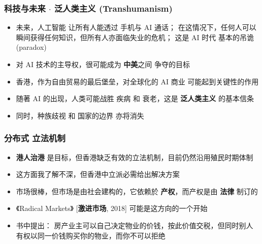 \documentclass[10pt]{beamer}
\newcommand{\emp}[1]{{\color{blue}\textbf{#1}}}
\newif\ifframeinlbf
\begin{document}
\frameinlbftrue
\begin{frame}
\frametitle{科技与未来 $\cdot$ 泛人类主义 (Transhumanism)}
\begin{itemize}
	\item 未来，人工智能 让所有人能透过 手机与 AI 通话； 在这情况下，任何人可以瞬间获得任何知识，但所有人亦面临失业的危机； 这是 AI 时代 基本的吊诡 (paradox)
	
	\item 对 AI 技术的主导权，很可能成为 \textbf{中美}之间 争夺的目标
	
	\item 香港，作为自由贸易的最后堡垒，对全球化的 AI 商业 可能起到关键性的作用
	
	\item 随著 AI 的出现，人类可能战胜 疾病 和 衰老，这是 \emp{泛人类主义} 的基本信条
	
	\item 同时，种族歧视 和 国家的边界 亦将消失
\end{itemize}
\end{frame}



\frameinlbftrue
\begin{frame}
\frametitle{分布式 立法机制}
\begin{itemize}
	\item \emp{港人治港} 是目标，但香港缺乏有效的立法机制，目前仍然沿用殖民时期体制
	
	\item 这方面我了解不深，但香港中立派必需给出解决方案
	
	\item 市场很棒，但市场是由社会建构的，它依赖於 \emp{产权}，而产权是由 \emp{法律} 制订的

	\item 《Radical Markets》 [\emp{激进市场}, 2018] 可能是这方向的一个开始
	
	\item 书中提出： 房产业主可以自己决定物业的价钱，按此价值交税，但同时别人有权以同一价钱购买你的物业，而你不可以拒绝
	
\end{itemize}
\end{frame}
\end{document}
